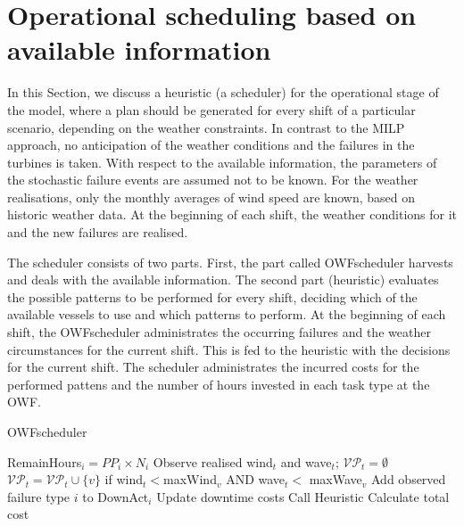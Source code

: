 \section{Operational scheduling based on available information}
\label{sec:heuristic}
In this Section, we discuss a heuristic (a scheduler) for the operational stage of the model, where a plan should be generated for every shift of a particular scenario, depending on the weather constraints. In contrast to the MILP approach, no  anticipation of the weather conditions and the failures in the turbines is taken. With respect to the available information, the parameters of the stochastic failure events are assumed not to be known. For the weather realisations, only the monthly averages of wind speed are known, based on historic weather data. At the beginning of each shift, the weather conditions for it and the new failures are realised.

The scheduler consists of two parts. First, the part called OWFscheduler harvests and deals with the available information. The second part (heuristic) evaluates the possible patterns to be performed for every shift, deciding which of the available vessels to use and which patterns to perform.
%
At the beginning of each shift, the OWFscheduler administrates the occurring failures and the weather circumstances for the current shift. This is fed to the heuristic with the decisions for the current shift. The scheduler administrates the incurred costs for the performed pattens and the number of hours invested in each task type at the OWF.
\begin{algorithm}[h]
	\caption{OWFscheduler}
	\label{alg:scheduler}
	\begin{algorithmic}
		\medskip
			\STATE RemainHours$_i=PP_i\times N_i$
		\ENDFOR
			\STATE Observe realised  wind$_t$ and wave$_t$; $\mathcal{VP}_t=\emptyset$
				\STATE $\mathcal{VP}_t=\mathcal{VP}_t \cup \{v\}$ if wind$_t<$maxWind$_v$ AND wave$_t<$ maxWave$_v$
				\STATE Add observed failure type $i$ to DownAct$_i$
				\STATE Update downtime costs
			\ENDFOR
			\STATE Call Heuristic
			\ENDFOR
		\STATE Calculate total cost
		\vskip 5pt
	\end{algorithmic}
\end{algorithm}
